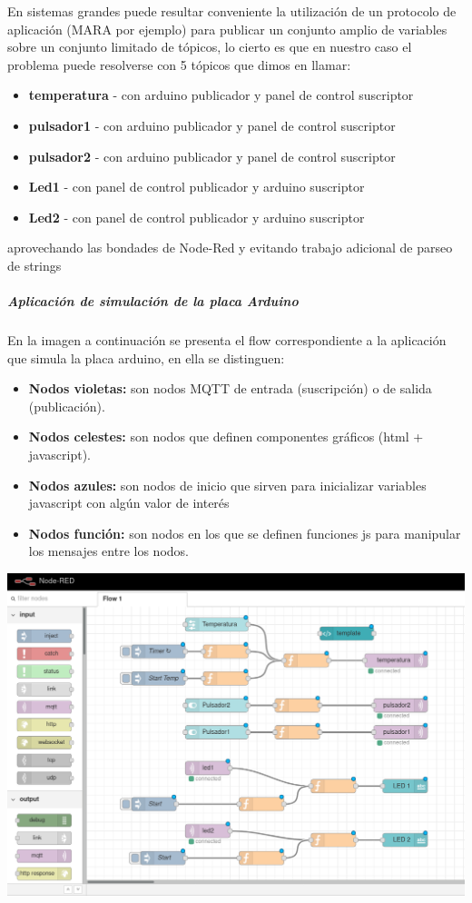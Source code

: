 \documentclass[11pt]{article}
\makeatletter
\def\maxwidth{\ifdim\Gin@nat@width>\linewidth\linewidth
    \else\Gin@nat@width\fi}
\let\Oldincludegraphics\includegraphics
\renewcommand{\includegraphics}[1]{\Oldincludegraphics[width=.8\maxwidth]{#1}}
\makeatother
\begin{document}
En sistemas grandes puede resultar conveniente la utilización de un
protocolo de aplicación (MARA por ejemplo) para publicar un conjunto
amplio de variables sobre un conjunto limitado de tópicos, lo cierto es
que en nuestro caso el problema puede resolverse con 5 tópicos que dimos
en llamar:

\begin{itemize}
\item
  \textbf{temperatura} - con arduino publicador y panel de control
  suscriptor
\item
  \textbf{pulsador1} - con arduino publicador y panel de control
  suscriptor
\item
  \textbf{pulsador2} - con arduino publicador y panel de control
  suscriptor
\item
  \textbf{Led1} - con panel de control publicador y arduino suscriptor
\item
  \textbf{Led2} - con panel de control publicador y arduino suscriptor
\end{itemize}

aprovechando las bondades de Node-Red y evitando trabajo adicional de
parseo de strings

    \hypertarget{aplicaciuxf3n-de-simulaciuxf3n-de-la-placa-arduino}{%
\subparagraph{Aplicación de simulación de la placa
Arduino}\label{aplicaciuxf3n-de-simulaciuxf3n-de-la-placa-arduino}}

En la imagen a continuación se presenta el flow correspondiente a la
aplicación que simula la placa arduino, en ella se distinguen:

\begin{itemize}
\item
  \textbf{Nodos violetas:} son nodos MQTT de entrada (suscripción) o de
  salida (publicación).
\item
  \textbf{Nodos celestes:} son nodos que definen componentes gráficos
  (html + javascript).
\item
  \textbf{Nodos azules:} son nodos de inicio que sirven para inicializar
  variables javascript con algún valor de interés
\item
  \textbf{Nodos función:} son nodos en los que se definen funciones js
  para manipular los mensajes entre los nodos.
\end{itemize}

    \includegraphics{images/node-red-sim-ardu.png}
\end{document}
